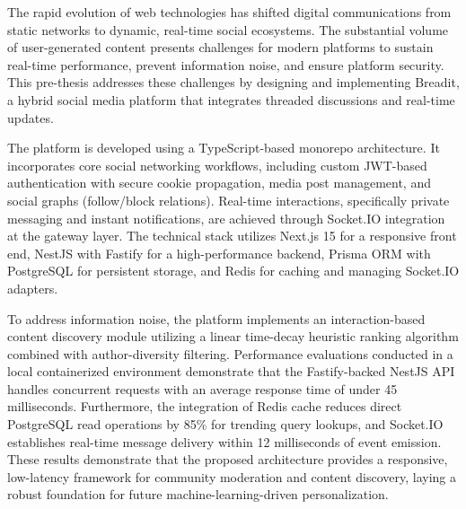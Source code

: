 
The rapid evolution of web technologies has shifted digital communications from static networks to dynamic, real-time social ecosystems. The substantial volume of user-generated content presents challenges for modern platforms to sustain real-time performance, prevent information noise, and ensure platform security. This pre-thesis addresses these challenges by designing and implementing Breadit, a hybrid social media platform that integrates threaded discussions and real-time updates.

The platform is developed using a TypeScript-based monorepo architecture. It incorporates core social networking workflows, including custom JWT-based authentication with secure cookie propagation, media post management, and social graphs (follow/block relations). Real-time interactions, specifically private messaging and instant notifications, are achieved through Socket.IO integration at the gateway layer. The technical stack utilizes Next.js 15 for a responsive front end, NestJS with Fastify for a high-performance backend, Prisma ORM with PostgreSQL for persistent storage, and Redis for caching and managing Socket.IO adapters.

To address information noise, the platform implements an interaction-based content discovery module utilizing a linear time-decay heuristic ranking algorithm combined with author-diversity filtering. Performance evaluations conducted in a local containerized environment demonstrate that the Fastify-backed NestJS API handles concurrent requests with an average response time of under 45 milliseconds. Furthermore, the integration of Redis cache reduces direct PostgreSQL read operations by 85\% for trending query lookups, and Socket.IO establishes real-time message delivery within 12 milliseconds of event emission. These results demonstrate that the proposed architecture provides a responsive, low-latency framework for community moderation and content discovery, laying a robust foundation for future machine-learning-driven personalization.
